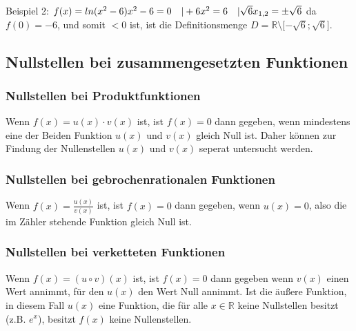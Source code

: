 \documentclass{article}
\begin{document}
    Beispiel 2:\break \break
    $
    f(x) = ln(x^2-6) \break \break
    x^2-6 = 0 \quad |+6 \break
    x^2 = 6 \quad |\sqrt{6} \break
    x_{1,2} = \pm \sqrt{6} \break \break
    $
    da $f(0) = -6$, und somit $<0$ ist, ist die Definitionsmenge $D =  \mathbb{R} \setminus \lbrack -\sqrt{6};\sqrt{6} \rbrack $.
    
    \subsection*{Nullstellen bei zusammengesetzten Funktionen}

    \subsubsection*{Nullstellen bei Produktfunktionen}
    Wenn $f(x) = u(x) \cdot v(x)$ ist, ist $f(x) = 0$ dann gegeben, wenn mindestens eine der Beiden Funktion $u(x)$ und $v(x)$ gleich Null ist.
    Daher können zur Findung der Nullenstellen $u(x)$ und $v(x)$ seperat untersucht werden.

    \subsubsection*{Nullstellen bei gebrochenrationalen Funktionen}
    Wenn $f(x) = \frac{u(x)}{v(x)}$ ist, ist $f(x) = 0$ dann gegeben, wenn $u(x) = 0$, also die im Zähler stehende Funktion gleich Null ist.

    \subsubsection*{Nullstellen bei verketteten Funktionen}
    Wenn $f(x) = (u \circ v)(x)$ ist, ist $f(x) = 0$ dann gegeben wenn $v(x)$ einen Wert annimmt, für den $u(x)$ den Wert Null annimmt.
    Ist die äußere Funktion, in diesem Fall $u(x)$ eine Funktion, die für alle $x \in \mathbb{R}$ keine Nullstellen besitzt \break (z.B. $e^x$), besitzt $f(x)$ keine Nullenstellen.

    
\end{document}
